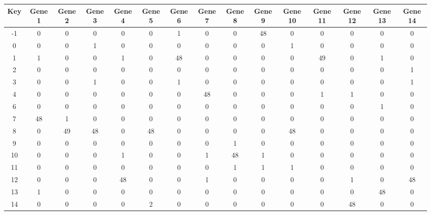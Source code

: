 \begin{tabular}{|c|c|c|c|c|c|c|c|c|c|c|c|c|c|c|}
\hline
Key & Gene 1 & Gene 2 & Gene 3 & Gene 4 & Gene 5 & Gene 6 & Gene 7 & Gene 8 & Gene 9 & Gene 10 & Gene 11 & Gene 12 & Gene 13 & Gene 14 \\
\hline
-1 & 0 & 0 & 0 & 0 & 0 & 1 & 0 & 0 & 48 & 0 & 0 & 0 & 0 & 0 \\
0 & 0 & 0 & 1 & 0 & 0 & 0 & 0 & 0 & 0 & 1 & 0 & 0 & 0 & 0 \\
1 & 1 & 0 & 0 & 1 & 0 & 48 & 0 & 0 & 0 & 0 & 49 & 0 & 1 & 0 \\
2 & 0 & 0 & 0 & 0 & 0 & 0 & 0 & 0 & 0 & 0 & 0 & 0 & 0 & 1 \\
3 & 0 & 0 & 1 & 0 & 0 & 1 & 0 & 0 & 0 & 0 & 0 & 0 & 0 & 1 \\
4 & 0 & 0 & 0 & 0 & 0 & 0 & 48 & 0 & 0 & 0 & 1 & 1 & 0 & 0 \\
6 & 0 & 0 & 0 & 0 & 0 & 0 & 0 & 0 & 0 & 0 & 0 & 0 & 1 & 0 \\
7 & 48 & 1 & 0 & 0 & 0 & 0 & 0 & 0 & 0 & 0 & 0 & 0 & 0 & 0 \\
8 & 0 & 49 & 48 & 0 & 48 & 0 & 0 & 0 & 0 & 48 & 0 & 0 & 0 & 0 \\
9 & 0 & 0 & 0 & 0 & 0 & 0 & 0 & 1 & 0 & 0 & 0 & 0 & 0 & 0 \\
10 & 0 & 0 & 0 & 1 & 0 & 0 & 1 & 48 & 1 & 0 & 0 & 0 & 0 & 0 \\
11 & 0 & 0 & 0 & 0 & 0 & 0 & 0 & 1 & 1 & 1 & 0 & 0 & 0 & 0 \\
12 & 0 & 0 & 0 & 48 & 0 & 0 & 1 & 0 & 0 & 0 & 0 & 1 & 0 & 48 \\
13 & 1 & 0 & 0 & 0 & 0 & 0 & 0 & 0 & 0 & 0 & 0 & 0 & 48 & 0 \\
14 & 0 & 0 & 0 & 0 & 2 & 0 & 0 & 0 & 0 & 0 & 0 & 48 & 0 & 0 \\
\hline
\end{tabular}